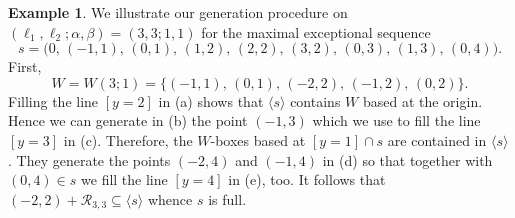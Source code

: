 \documentclass[11pt]{article}
\theoremstyle{definition}
\newtheorem{exam}[theo]{Example}
\numberwithin{equation}{section}
\newcommand{\CR}{{\mathcal R}}
\newcommand{\xa}{\alpha}
\newcommand{\xb}{\beta}
\newcommand{\cl}{s}
\newcommand{\Rect}{\CR}
\newcommand{\mes}{maximal exceptional sequence}
\begin{document}
\begin{exam}
\label{exam:Exam33}
We illustrate our generation procedure on 
$(\ell_1,\ell_2;\xa,\xb)=(3,3;1,1)$ for the {\mes} 
$$
\cl=\big(0,\,(-1,1),\,(0,1),\,(1,2),\,(2,2),\,
(3,2),\,(0,3),\,(1,3),\,(0,4)\big).
$$
First, 
$$
W=W(3;1)=\{(-1,1),\,(0,1),\,(-2,2),\,(-1,2),\,(0,2)\}.
$$
Filling the line $[y=2]$ in (a) shows that $\langle\cl\rangle$ 
contains $W$ based at the origin. Hence we can 
generate in (b) the point $(-1,3)$ which we use to 
fill the line $[y=3]$ in (c). Therefore, the 
$W$-boxes based at $[y=1]\cap\cl$ are contained 
in $\langle\cl\rangle$. They generate the points 
$(-2,4)$ and $(-1,4)$ in (d) so that together with 
$(0,4)\in\cl$ we fill the line $[y=4]$ in (e), too. 
It follows that $(-2,2)+\Rect_{3,3}
\subseteq\langle\cl\rangle$ whence $\cl$ is full.


\end{exam}
\end{document}
